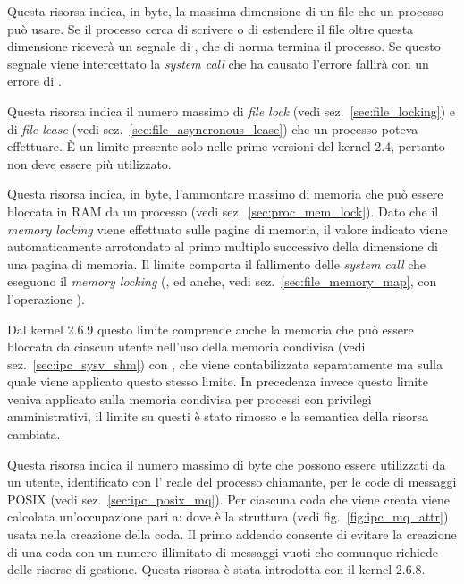 \begin{basedescript}{\desclabelwidth{2.2cm}}
\item[\constd{RLIMIT\_FSIZE}] Questa risorsa indica, in byte, la massima
  dimensione di un file che un processo può usare. Se il processo cerca di
  scrivere o di estendere il file oltre questa dimensione riceverà un segnale
  di , che di norma termina il processo. Se questo segnale
  viene intercettato la \textit{system call} che ha causato l'errore fallirà
  con un errore di .

\item[\constd{RLIMIT\_LOCKS}] Questa risorsa indica il numero massimo di
  \textit{file lock} (vedi sez.~\ref{sec:file_locking}) e di \textit{file
    lease} (vedi sez.~\ref{sec:file_asyncronous_lease}) che un processo poteva
  effettuare.  È un limite presente solo nelle prime versioni del kernel 2.4,
  pertanto non deve essere più utilizzato.

\item[\constd{RLIMIT\_MEMLOCK}] Questa risorsa indica, in byte, l'ammontare
  massimo di memoria che può essere bloccata in RAM da un processo (vedi
  sez.~\ref{sec:proc_mem_lock}). Dato che il \textit{memory locking} viene
  effettuato sulle pagine di memoria, il valore indicato viene automaticamente
  arrotondato al primo multiplo successivo della dimensione di una pagina di
  memoria. Il limite comporta il fallimento delle \textit{system call} che
  eseguono il \textit{memory locking} (,  ed anche,
  vedi sez.~\ref{sec:file_memory_map},  con l'operazione
  ).

  Dal kernel 2.6.9 questo limite comprende anche la memoria che può essere
  bloccata da ciascun utente nell'uso della memoria condivisa (vedi
  sez.~\ref{sec:ipc_sysv_shm}) con , che viene contabilizzata
  separatamente ma sulla quale viene applicato questo stesso limite. In
  precedenza invece questo limite veniva applicato sulla memoria condivisa per
  processi con privilegi amministrativi, il limite su questi è stato rimosso e
  la semantica della risorsa cambiata.


\item[\constd{RLIMIT\_MSGQUEUE}] Questa risorsa indica il numero massimo di
  byte che possono essere utilizzati da un utente, identificato con
  l' reale del processo chiamante, per le code di messaggi POSIX
  (vedi sez.~\ref{sec:ipc_posix_mq}). Per ciascuna coda che viene creata viene
  calcolata un'occupazione pari a:
dove  è la struttura  (vedi
fig.~\ref{fig:ipc_mq_attr}) usata nella creazione della coda. Il primo addendo
consente di evitare la creazione di una coda con un numero illimitato di
messaggi vuoti che comunque richiede delle risorse di gestione. Questa risorsa
è stata introdotta con il kernel 2.6.8.


\end{basedescript}
